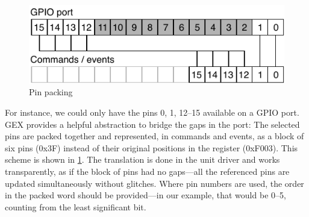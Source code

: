 \begin{figure}[h]
	\centering
	\includegraphics[scale=1] {img/pin-packing.pdf}
	\caption{\label{fig:pin-packing}Pin packing}
\end{figure}

For instance, we could only have the pins 0, 1, 12--15 available on a \gls{GPIO} port. GEX provides a helpful abstraction to bridge the gaps in the port: The selected pins are packed together and represented, in commands and events, as a block of six pins (0x3F) instead of their original positions in the register (0xF003). This scheme is shown in \cref{fig:pin-packing}. The translation is done in the unit driver and works transparently, as if the block of pins had no gaps---all the referenced pins are updated simultaneously without glitches. Where pin numbers are used, the order in the packed word should be provided---in our example, that would be 0--5, counting from the least significant bit.




















